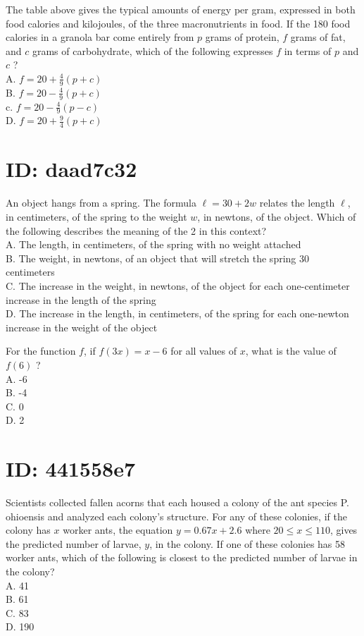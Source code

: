 The table above gives the typical amounts of energy per gram, expressed in both food calories and kilojoules, of the three macronutrients in food. If the 180 food calories in a granola bar come entirely from $p$ grams of protein, $f$ grams of fat, and $c$ grams of carbohydrate, which of the following expresses $f$ in terms of $p$ and $c$ ?\\
A. $f=20+\frac{4}{9}(p+c)$\\
B. $f=20-\frac{4}{9}(p+c)$\\
c. $f=20-\frac{4}{9}(p-c)$\\
D. $f=20+\frac{9}{4}(p+c)$

\section*{ID: daad7c32}
An object hangs from a spring. The formula $\ell=30+2 w$ relates the length $\ell$, in centimeters, of the spring to the weight $w$, in newtons, of the object. Which of the following describes the meaning of the 2 in this context?\\
A. The length, in centimeters, of the spring with no weight attached\\
B. The weight, in newtons, of an object that will stretch the spring 30 centimeters\\
C. The increase in the weight, in newtons, of the object for each one-centimeter increase in the length of the spring\\
D. The increase in the length, in centimeters, of the spring for each one-newton increase in the weight of the object

For the function $f$, if $f(3 x)=x-6$ for all values of $x$, what is the value of $f(6)$ ?\\
A. -6\\
B. -4\\
C. 0\\
D. 2

\section*{ID: 441558e7}
Scientists collected fallen acorns that each housed a colony of the ant species P. ohioensis and analyzed each colony's structure. For any of these colonies, if the colony has $x$ worker ants, the equation $y=0.67 x+2.6$ where $20 \leq x \leq 110$, gives the predicted number of larvae, $y$, in the colony. If one of these colonies has 58 worker ants, which of the following is closest to the predicted number of larvae in the colony?\\
A. 41\\
B. 61\\
C. 83\\
D. 190

